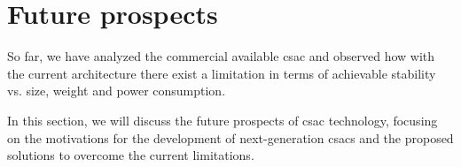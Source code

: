 \section{Future prospects}
\label{sec:future_prospects}

So far, we have analyzed the commercial available \acrshort{csac} and observed how with the current architecture there exist a limitation in terms of achievable stability vs. size, weight and power consumption.

In this section, we will discuss the future prospects of \acrshort{csac} technology, focusing on the motivations for the development of next-generation \acrshort{csacs} and the proposed solutions to overcome the current limitations.



